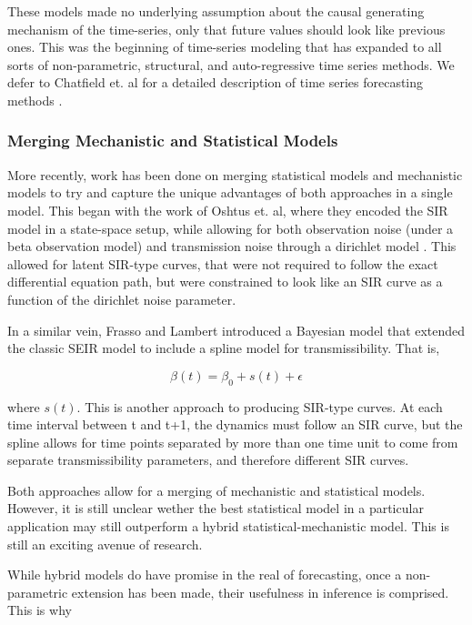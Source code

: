 \documentclass{umassthesis}          %
\begin{document}
These models made no underlying assumption about the causal generating mechanism of the time-series, only that future values should look like previous ones. This was the beginning of time-series modeling that has expanded to all sorts of non-parametric, structural, and auto-regressive time series methods. We defer to Chatfield et. al for a detailed description of time series forecasting methods \cite{chatfield2000time}.

\subsubsection{Merging Mechanistic and Statistical Models}

More recently, work has been done on merging statistical models and mechanistic models to try and capture the unique advantages of both approaches in a single model. This began with the work of Oshtus et. al, where they encoded the SIR model in a state-space setup, while allowing for both observation noise (under a beta observation model) and transmission noise through a dirichlet model \cite{osthus2017forecasting}. This allowed for latent SIR-type curves, that were not required to follow the exact differential equation path, but were constrained to look like an SIR curve as a function of the dirichlet noise parameter. 

In a similar vein, Frasso and Lambert introduced a Bayesian model that extended the classic SEIR model to include a spline model for transmissibility. That is, 

\begin{equation}
\beta(t) = \beta_0 + s(t) + \epsilon
\end{equation}

where $s(t)$. This is another approach to producing SIR-type curves. At each time interval between t and t+1, the dynamics must follow an SIR curve, but the spline allows for time points separated by more than one time unit to come from separate transmissibility parameters, and therefore different SIR curves. 

Both approaches allow for a merging of mechanistic and statistical models. However, it is still unclear wether the best statistical model in a particular application may still outperform a hybrid statistical-mechanistic model. This is still an exciting avenue of research.

While hybrid models do have promise in the real of forecasting, once a non-parametric extension has been made, their usefulness in inference is comprised. This is why 
\end{document}

